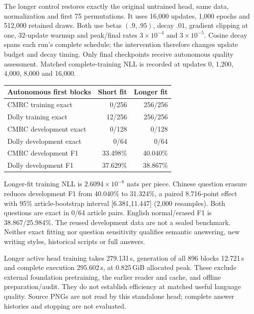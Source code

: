 The longer control restores exactly the original untrained head, same data,
normalization and first 75 permutations. It uses 16,000 updates, 1,000 epochs
and 512,000 retained draws. Both use betas $(.9,.95)$, decay $.01$, gradient
clipping at one, 32-update warmup and peak/final rates $3\times10^{-4}$ and
$3\times10^{-5}$. Cosine decay spans each run's complete schedule; the
intervention therefore changes update budget and decay timing. Only final
checkpoints receive autonomous quality assessment. Matched complete-training
NLL is recorded at updates 0, 1,200, 4,000, 8,000 and 16,000.

\begin{center}\begin{tabular}{lrr}
Autonomous first blocks & Short fit & Longer fit\\\hline
CMRC training exact & 0/256 & 256/256\\
Dolly training exact & 12/256 & 256/256\\
CMRC development exact & 0/128 & 0/128\\
Dolly development exact & 0/64 & 0/64\\
CMRC development F1 & 33.498\% & 40.040\%\\
Dolly development F1 & 37.629\% & 38.867\%\\
\end{tabular}\end{center}
Longer-fit training NLL is $2.6094\times10^{-8}$ nats per piece. Chinese
question erasure reduces development F1 from 40.040\% to 31.324\%, a paired
8.716-point effect with 95\% article-bootstrap interval [6.381,11.447]
(2,000 resamples). Both questions are exact in 0/64 article pairs. English
normal/erased F1 is 38.867/25.984\%. The reused development data are not a
sealed benchmark. Neither exact fitting nor question sensitivity qualifies
semantic answering, new writing styles, historical scripts or full answers.

Longer active head training takes 279.131\,s, generation of all 896 blocks
12.721\,s and complete execution 295.602\,s, at 0.825\,GiB allocated peak.
These exclude external foundation pretraining, the earlier reader and cache,
and offline preparation/audit. They do not establish efficiency at matched
useful language quality. Source PNGs are not read by this standalone head;
complete answer histories and stopping are not evaluated.

